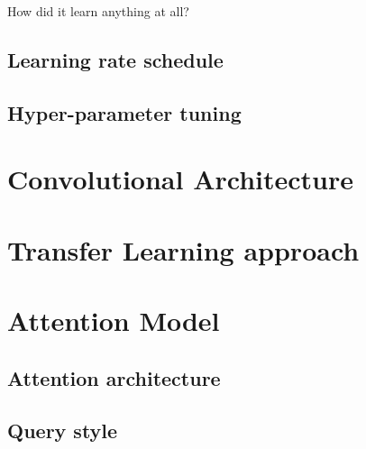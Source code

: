 How did it learn anything at all?

\subsection{Learning rate schedule}

\subsection{Hyper-parameter tuning}

\section{Convolutional Architecture}
\label{sec:convolutional_arch}

\section{Transfer Learning approach}
\label{sec:transfer_learning}

\section{Attention Model}
\label{sec:attention_model}

\subsection{Attention architecture}

\subsection{Query style}
